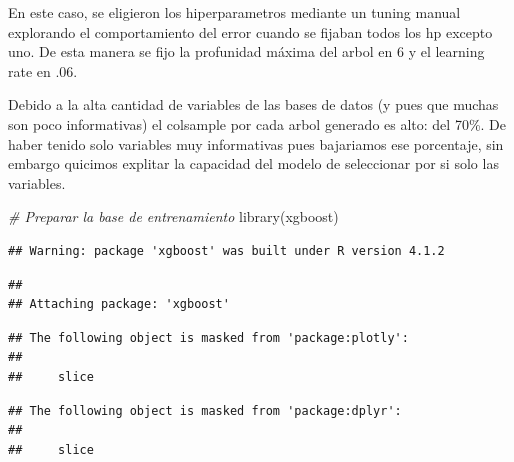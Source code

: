 \documentclass[
]{article}
\newenvironment{Shaded}{\begin{snugshade}}{\end{snugshade}}
\newcommand{\CommentTok}[1]{\textcolor[rgb]{0.56,0.35,0.01}{\textit{#1}}}
\newcommand{\FunctionTok}[1]{\textcolor[rgb]{0.00,0.00,0.00}{#1}}
\newcommand{\NormalTok}[1]{#1}
\begin{document}
En este caso, se eligieron los hiperparametros mediante un tuning manual
explorando el comportamiento del error cuando se fijaban todos los hp
excepto uno. De esta manera se fijo la profunidad máxima del arbol en 6
y el learning rate en .06.

Debido a la alta cantidad de variables de las bases de datos (y pues que
muchas son poco informativas) el colsample por cada arbol generado es
alto: del 70\%. De haber tenido solo variables muy informativas pues
bajariamos ese porcentaje, sin embargo quicimos explitar la capacidad
del modelo de seleccionar por si solo las variables.

\begin{Shaded}
\begin{Highlighting}[]
\CommentTok{\# Preparar la base de entrenamiento}
\FunctionTok{library}\NormalTok{(xgboost)}
\end{Highlighting}
\end{Shaded}

\begin{verbatim}
## Warning: package 'xgboost' was built under R version 4.1.2
\end{verbatim}

\begin{verbatim}
## 
## Attaching package: 'xgboost'
\end{verbatim}

\begin{verbatim}
## The following object is masked from 'package:plotly':
## 
##     slice
\end{verbatim}

\begin{verbatim}
## The following object is masked from 'package:dplyr':
## 
##     slice
\end{verbatim}
\end{document}
